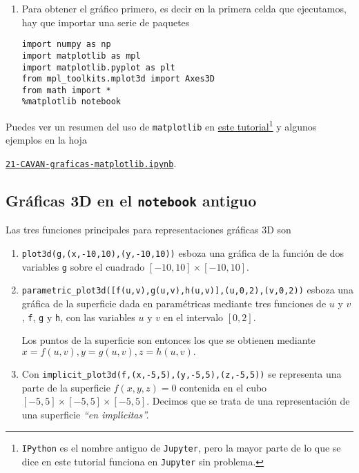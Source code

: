 \begin{enumerate}
\item Para obtener el gr\'afico primero, es decir en la primera celda que ejecutamos,  hay que importar una serie de paquetes 

\begin{lstlisting}
import numpy as np
import matplotlib as mpl
import matplotlib.pyplot as plt
from mpl_toolkits.mplot3d import Axes3D
from math import *
%matplotlib notebook
\end{lstlisting}


\end{enumerate}







Puedes ver un resumen del uso de {\tt matplotlib} en \href{http://pausa.mat.uam.es/PDFs/CAVAN/matplotlib.pdf}{este tutorial}\footnote{{\tt IPython} es el nombre antiguo de {\tt Jupyter}, pero la mayor parte de lo que se dice en este tutorial funciona en {\tt Jupyter} sin problema.} y algunos ejemplos en la hoja 
\begin{center}
 \href{http://localhost:8888/notebooks/CAVAN/21-CAVAN-graficas-matplotlib.ipynb}{\tt 21-CAVAN-graficas-matplotlib.ipynb}.
\end{center}

\subsection{Gr\'aficas 3D en el {\tt notebook} antiguo}
Las tres funciones principales para representaciones gr\'aficas 3D son

\begin{enumerate}
	
	\item \lstinline|plot3d(g,(x,-10,10),(y,-10,10))|  esboza una gráfica de la
	función de dos variables  %
	\lstinline|g| sobre el cuadrado  $[-10,10]\times [-10,10]$.
	
	
	\item \lstinline|parametric_plot3d([f(u,v),g(u,v),h(u,v)],(u,0,2),(v,0,2))| 
	esboza una gráfica de la
	superficie  dada en param\'etricas mediante  tres  funciones de $u$ y $v$,    %
	\lstinline|f|, \lstinline|g| y \lstinline|h|,  con las variables $u$ y $v$  en 
	el intervalo $[0,2]$.
	
	Los puntos de la superficie son entonces los que se obtienen mediante
	$x=f(u,v),y=g(u,v),z=h(u,v).$
	
	\item Con \lstinline|implicit_plot3d(f,(x,-5,5),(y,-5,5),(z,-5,5))| 
	se representa una parte de  la superficie $f(x,y,z)=0$ contenida en el
	cubo $[-5,5]\times [-5,5]\times [-5,5]$. Decimos que se trata de una
	representaci\'on de una superficie {\itshape ``en impl\'{\i}citas''.}
	\end{enumerate}

